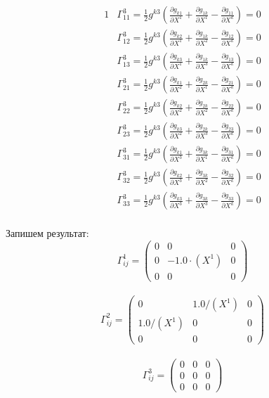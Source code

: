 \documentclass[a4paper, 12pt, oneside]{article}
\begin{document}
\begin{alignat*}{1}
  & \Gamma^3_{11} = \frac{1}{2}g^{k3}(\frac{\partial g_{k1}}{\partial X^1} + \frac{\partial g_{1k}}{\partial X^1} - \frac{\partial g_{11}}{\partial X^k}) = 0 \\
  & \Gamma^3_{12} = \frac{1}{2}g^{k3}(\frac{\partial g_{k2}}{\partial X^1} + \frac{\partial g_{1k}}{\partial X^2} - \frac{\partial g_{12}}{\partial X^k}) = 0 \\
  & \Gamma^3_{13} = \frac{1}{2}g^{k3}(\frac{\partial g_{k3}}{\partial X^1} + \frac{\partial g_{1k}}{\partial X^3} - \frac{\partial g_{13}}{\partial X^k}) = 0 \\
  & \Gamma^3_{21} = \frac{1}{2}g^{k3}(\frac{\partial g_{k1}}{\partial X^2} + \frac{\partial g_{2k}}{\partial X^1} - \frac{\partial g_{21}}{\partial X^k}) = 0 \\
  & \Gamma^3_{22} = \frac{1}{2}g^{k3}(\frac{\partial g_{k2}}{\partial X^2} + \frac{\partial g_{2k}}{\partial X^2} - \frac{\partial g_{22}}{\partial X^k}) = 0 \\
  & \Gamma^3_{23} = \frac{1}{2}g^{k3}(\frac{\partial g_{k3}}{\partial X^2} + \frac{\partial g_{2k}}{\partial X^3} - \frac{\partial g_{23}}{\partial X^k}) = 0 \\
  & \Gamma^3_{31} = \frac{1}{2}g^{k3}(\frac{\partial g_{k1}}{\partial X^3} + \frac{\partial g_{3k}}{\partial X^1} - \frac{\partial g_{31}}{\partial X^k}) = 0 \\
  & \Gamma^3_{32} = \frac{1}{2}g^{k3}(\frac{\partial g_{k2}}{\partial X^3} + \frac{\partial g_{3k}}{\partial X^2} - \frac{\partial g_{32}}{\partial X^k}) = 0 \\
  & \Gamma^3_{33} = \frac{1}{2}g^{k3}(\frac{\partial g_{k3}}{\partial X^3} + \frac{\partial g_{3k}}{\partial X^3} - \frac{\partial g_{33}}{\partial X^k}) = 0 
\end{alignat*}\\
Запишем результат:\\
\[
\Gamma^1_{ij} = \begin{pmatrix}
	0 & 0 & 0\\
	0 & -1.0\cdot (X^1) & 0\\
	0 & 0 & 0
\end{pmatrix}
\]\\
\[
\Gamma^2_{ij} = \begin{pmatrix}
	0 & 1.0/(X^1) & 0\\
	1.0/(X^1) & 0 & 0\\
	0 & 0 & 0
\end{pmatrix}
\]\\
\[
\Gamma^3_{ij} = \begin{pmatrix}
	0 & 0 & 0\\
	0 & 0 & 0\\
	0 & 0 & 0
\end{pmatrix}
\]\\
\end{document}
